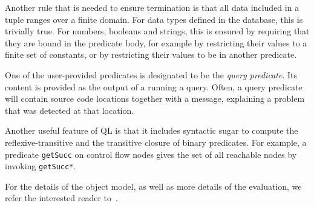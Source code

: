 Another rule that is needed to ensure termination is that all data included in a tuple 
ranges over a finite domain.
For data types defined in the database, this is trivially true.
For numbers, booleans and strings, this is ensured by requiring that they are bound 
in the predicate body, for example by restricting their values to a finite set of constants,
or by restricting their values to be in another predicate.

One of the user-provided predicates is designated to be the \emph{query predicate}.
Its content is provided as the output of a running a query.
Often, a query predicate will contain source code locations together with a message,
explaining a problem that was detected at that location.

Another useful feature of QL is that it includes syntactic sugar to compute the reflexive-transitive
and the transitive closure of binary predicates.
For example, a predicate \texttt{getSucc} on control flow nodes gives the set of all reachable
nodes by invoking \texttt{getSucc*}.

For the details of the object model, as well as more details of the evaluation, we refer
the interested reader to~\cite{qlpaper}.
